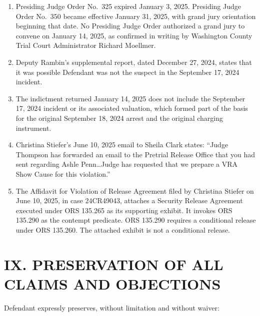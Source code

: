 \documentclass[12pt,letterpaper]{article}
\begin{document}
\begin{enumerate}[leftmargin=*, label=\arabic*., itemsep=4pt]
\item Presiding Judge Order No.\ 325 expired January 3, 2025. Presiding Judge
Order No.\ 350 became effective January 31, 2025, with grand jury orientation
beginning that date. No Presiding Judge Order authorized a grand jury to convene
on January 14, 2025, as confirmed in writing by Washington County Trial Court
Administrator Richard Moellmer.

\item Deputy Rambin's supplemental report, dated December 27, 2024, states that
it was possible Defendant was not the suspect in the September 17, 2024 incident.

\item The indictment returned January 14, 2025 does not include the September 17,
2024 incident or its associated valuation, which formed part of the basis for
the original September 18, 2024 arrest and the original charging instrument.

\item Christina Stiefer's June 10, 2025 email to Sheila Clark states: ``Judge
Thompson has forwarded an email to the Pretrial Release Office that you had sent
regarding Ashle Penn\ldots Judge has requested that we prepare a VRA Show Cause
for this violation.''

\item The Affidavit for Violation of Release Agreement filed by Christina Stiefer
on June 10, 2025, in case 24CR49043, attaches a Security Release Agreement
executed under ORS 135.265 as its supporting exhibit. It invokes ORS 135.290 as
the contempt predicate. ORS 135.290 requires a conditional release under ORS
135.260. The attached exhibit is not a conditional release.

\end{enumerate}


\section*{IX. PRESERVATION OF ALL CLAIMS AND OBJECTIONS}

Defendant expressly preserves, without limitation and without waiver:
\end{document}
